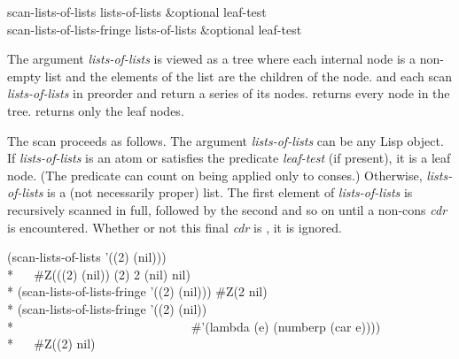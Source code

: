 \begin{defun}[Function]
scan-lists-of-lists lists-of-lists &optional leaf-test \\
scan-lists-of-lists-fringe lists-of-lists &optional leaf-test

The argument {\it lists-of-lists} is viewed as a tree where each
internal node is a non-empty list and the elements of the list are the
children of the node.   and
 each scan {\it lists-of-lists} in preorder
and return a series of its nodes.   returns every
node in the tree.   returns only the leaf
nodes.  

The scan proceeds as follows.  The argument {\it lists-of-lists} can be any
Lisp object.  If {\it lists-of-lists} is an atom or satisfies the predicate
{\it leaf-test} (if present), it is a leaf node.  (The predicate can count
on being applied only to conses.) Otherwise, {\it lists-of-lists} is a (not
necessarily proper) list.  The first element of {\it lists-of-lists} is
recursively scanned in full, followed by the second and so on until a
non-cons {\it cdr} is encountered.  Whether or not this final {\it cdr} is
, it is ignored.
\begin{lisp}
(scan-lists-of-lists '((2) (nil))) \\*
~~{\EV} \#Z(((2) (nil)) (2) 2 (nil) nil) \\*
(scan-lists-of-lists-fringe '((2) (nil))) {\EV} \#Z(2 nil) \\*
(scan-lists-of-lists-fringe '((2) (nil)) \\*
~~~~~~~~~~~~~~~~~~~~~~~~~~~~\#'(lambda (e) (numberp (car e)))) \\*
~~{\EV} \#Z((2) nil)
\end{lisp}
\end{defun}

